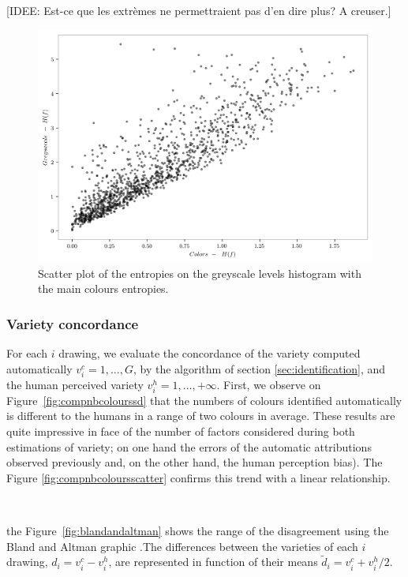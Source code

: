 \documentclass[11pt,a4paper]{article}
\begin{document}
{\color{teal}[IDEE: Est-ce que les extr\`emes ne permettraient pas d'en dire plus? A creuser.]}

\begin{figure}[h!]
	\centering
	\includegraphics[width=\linewidth]{figures/colors-greysacale-entropies.png}
	\caption{Scatter plot of the entropies on the greyscale levels histogram with the main colours entropies.}
	\label{fig:entropies}
\end{figure}

\subsubsection{Variety concordance}

For each $i$ drawing, we evaluate the concordance of the variety computed automatically $v^c_i = {1, \dots, G}$, by the algorithm of section \ref{sec:identification}, and the human perceived variety $v^h_i = {1, \dots, +\infty}$. 
First, we observe on Figure~\ref{fig:compnbcolourssd} that the numbers of colours identified automatically is different to the humans in a range of two colours in average. 
These results are quite impressive in face of the number of factors considered during both estimations of variety; on one hand the errors of the automatic attributions observed previously and, on the other hand, the human perception bias). 
The Figure \ref{fig:compnbcoloursscatter} confirms this trend with a linear relationship.

\

the Figure~\ref{fig:blandandaltman} shows the range of the disagreement using the Bland and Altman graphic \cite{bland1986}.The differences between the varieties of each $i$ drawing,  $d_i = v^c_i - v^h_i$, are represented in function of their means $\tilde{d}_i = v^c_i + v^h_i/2$.
\end{document}
